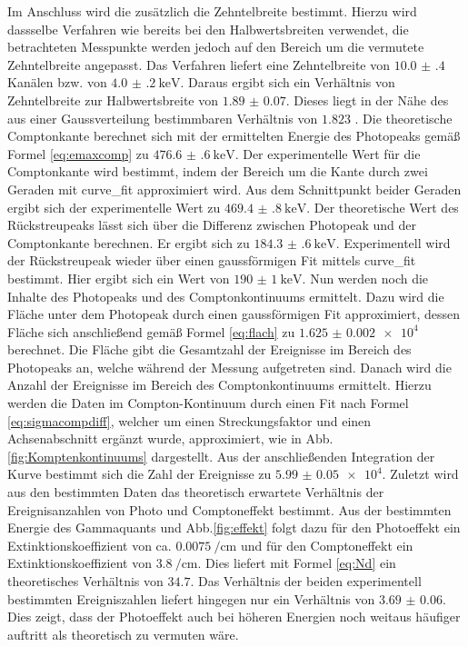 Im Anschluss wird die zusätzlich die Zehntelbreite bestimmt. Hierzu wird dassselbe Verfahren wie bereits bei den Halbwertsbreiten verwendet, die betrachteten Messpunkte werden jedoch auf den Bereich um die vermutete Zehntelbreite angepasst. Das Verfahren liefert eine Zehntelbreite von $\num{10.0(4)}$ Kanälen bzw. von $\SI{4.0(2)}{\kilo\electronvolt}$. Daraus ergibt sich ein Verhältnis von Zehntelbreite zur Halbwertsbreite von $\num{1.89(7)}$. Dieses liegt in der Nähe des aus einer Gaussverteilung bestimmbaren Verhältnis von $\num{1.823}$  \cite{V18}. Die theoretische Comptonkante berechnet sich mit der ermittelten Energie des Photopeaks gemäß Formel \eqref{eq:emaxcomp} zu $\SI{476.6(6)}{\kilo\electronvolt}$. Der experimentelle Wert für die Comptonkante wird bestimmt, indem der Bereich um die Kante durch zwei Geraden mit curve\_fit \cite{scipy} approximiert wird. Aus dem Schnittpunkt beider Geraden ergibt sich der experimentelle Wert zu $\SI{469.4(8)}{\kilo\electronvolt}$. Der theoretische Wert des Rückstreupeaks lässt sich über die Differenz zwischen Photopeak und der Comptonkante berechnen. Er ergibt sich zu $\SI{184.3(6)}{\kilo\electronvolt}$. Experimentell wird der Rückstreupeak wieder über einen gaussförmigen Fit mittels curve\_fit bestimmt. Hier ergibt sich ein Wert von $\SI{190(1)}{\kilo\electronvolt}$. Nun werden noch die Inhalte des Photopeaks und des Comptonkontinuums ermittelt. Dazu wird die Fläche unter dem Photopeak durch einen gaussförmigen Fit approximiert, dessen Fläche sich anschließend gemäß Formel \eqref{eq:flach} zu $\num{1.625(2)e4}$ berechnet. Die Fläche gibt die Gesamtzahl der Ereignisse im Bereich des Photopeaks an, welche während der Messung aufgetreten sind. Danach wird die Anzahl der Ereignisse im Bereich des Comptonkontinuums ermittelt. Hierzu werden die Daten im Compton-Kontinuum durch einen Fit nach Formel \eqref{eq:sigmacompdiff}, welcher um einen Streckungsfaktor und einen Achsenabschnitt ergänzt wurde, approximiert, wie in Abb. \ref{fig:Komptenkontinuums} dargestellt. Aus der anschließenden Integration der Kurve bestimmt sich die Zahl der Ereignisse zu $\num{5.99(5)e4}$. Zuletzt wird aus den bestimmten Daten das theoretisch erwartete Verhältnis der Ereignisanzahlen von Photo und Comptoneffekt bestimmt. Aus der bestimmten Energie des Gammaquants und Abb.\ref{fig:effekt} folgt dazu für den Photoeffekt ein Extinktionskoeffizient von ca. $\SI{0.0075}{\per\centi\meter}$ und für den Comptoneffekt ein Extinktionskoeffizient von $\SI{3.8}{\per\centi\meter}$. Dies liefert mit Formel \eqref{eq:Nd} ein theoretisches Verhältnis von $34.7$. Das Verhältnis der beiden experimentell bestimmten Ereigniszahlen liefert hingegen nur ein Verhältnis von $\num{3.69(6)}$. Dies zeigt, dass der Photoeffekt auch bei höheren Energien noch weitaus häufiger auftritt als theoretisch zu vermuten wäre. 







